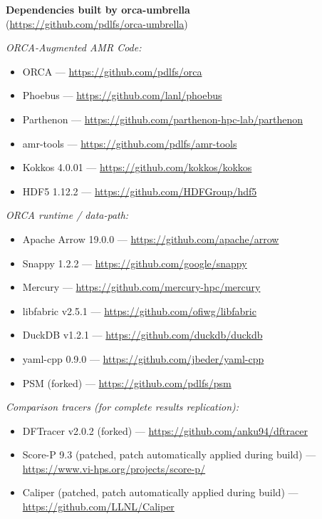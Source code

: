 \documentclass[nonacm,sigconf]{acmart}
\begin{document}
\noindent\textbf{Dependencies built by orca-umbrella} \\
(\url{https://github.com/pdlfs/orca-umbrella})

\vspace{0.5em}
\noindent \emph{ORCA-Augmented AMR Code:}
\begin{itemize}[topsep=0pt]
	\item ORCA --- \url{https://github.com/pdlfs/orca}
	\item Phoebus --- \url{https://github.com/lanl/phoebus}
	\item Parthenon --- \url{https://github.com/parthenon-hpc-lab/parthenon}
	\item amr-tools --- \url{https://github.com/pdlfs/amr-tools}
	\item Kokkos 4.0.01 --- \url{https://github.com/kokkos/kokkos}
	\item HDF5 1.12.2 --- \url{https://github.com/HDFGroup/hdf5}
\end{itemize}

\vspace{0.5em}
\noindent\emph{ORCA runtime / data-path:}
\begin{itemize}[topsep=0pt]
	\item Apache Arrow 19.0.0 --- \url{https://github.com/apache/arrow}
	\item Snappy 1.2.2 --- \url{https://github.com/google/snappy}
	\item Mercury --- \url{https://github.com/mercury-hpc/mercury}
	\item libfabric v2.5.1 --- \url{https://github.com/ofiwg/libfabric}
	\item DuckDB v1.2.1 --- \url{https://github.com/duckdb/duckdb}
	\item yaml-cpp 0.9.0 --- \url{https://github.com/jbeder/yaml-cpp}
	\item PSM (forked) --- \url{https://github.com/pdlfs/psm}
\end{itemize}

\vspace{0.5em}
\noindent\emph{Comparison tracers (for complete results replication):}
\begin{itemize}[topsep=0pt]
	\item DFTracer v2.0.2 (forked) --- \url{https://github.com/anku94/dftracer}
	\item Score-P 9.3 (patched, patch automatically applied during build) --- \url{https://www.vi-hps.org/projects/score-p/}
	\item Caliper (patched, patch automatically applied during build) --- \url{https://github.com/LLNL/Caliper}
\end{itemize}
\end{document}
